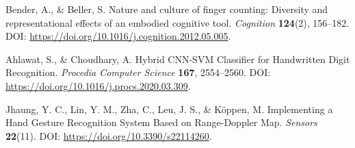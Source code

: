 \documentclass[12pt,a4paper]{article}
\begin{document}
\begin{itemize}
\begin{itemize}
\end{itemize}





\begin{thebibliography}{999}

Bender, A., \& Beller, S. Nature and culture of finger counting: Diversity and representational effects of an embodied cognitive tool. {\em Cognition} {\bf 124}(2), 156--182. DOI: \url{https://doi.org/10.1016/j.cognition.2012.05.005}.

Ahlawat, S., \& Choudhary, A. Hybrid CNN-SVM Classifier for Handwritten Digit Recognition. {\em Procedia Computer Science} {\bf 167}, 2554--2560. DOI: \url{https://doi.org/10.1016/j.procs.2020.03.309}.

Jhaung, Y. C., Lin, Y. M., Zha, C., Leu, J. S., \& Köppen, M. Implementing a Hand Gesture Recognition System Based on Range-Doppler Map. {\em Sensors} {\bf 22}(11). DOI: \url{https://doi.org/10.3390/s22114260}.

\end{thebibliography}
\end{document}
